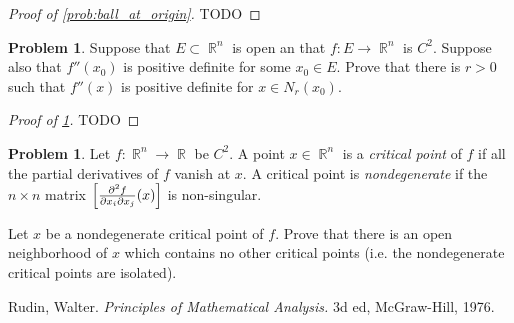 \documentclass[english]{article}
\DeclareMathOperator{\R}{\mathbb{R}}
\theoremstyle{definition}
\newtheorem{problem}[theorem]{Problem}
\begin{document}
\begin{proof}[Proof of \cref{prob:ball_at_origin}]
    TODO
\end{proof}

\begin{problem}
    \label{prob:small_ball}
    Suppose that $E \subset \R^n$ is open an that $f: E \to \R^n$ is $C^2$. Suppose also that $f''(x_0)$ is positive definite for some $x_0 \in E$. Prove that there is $r > 0$ such that $f''(x)$ is positive definite for $x \in N_r(x_0)$.
\end{problem}

\begin{proof}[Proof of \cref{prob:small_ball}]
    TODO
\end{proof}

\begin{problem}
    Let $f: \R^n \to \R$ be $C^2$. A point $x \in \R^n$ is a \textit{critical point} of $f$ if all the partial derivatives of $f$ vanish at $x$. A critical point is \textit{nondegenerate} if the $n \times n$ matrix $\left[ {\partial^2 f \over \partial x_i \partial x_j } (x) \right]$ is non-singular. 

    Let $x$ be a nondegenerate critical point of $f$. Prove that there is an open neighborhood of $x$ which contains no other critical points (i.e. the nondegenerate critical points are isolated).
\end{problem}




\pagebreak

\begin{thebibliography}{9}
    Rudin, Walter. \textit{Principles of Mathematical Analysis.} 3d ed, McGraw-Hill, 1976.
\end{thebibliography}
\end{document}

